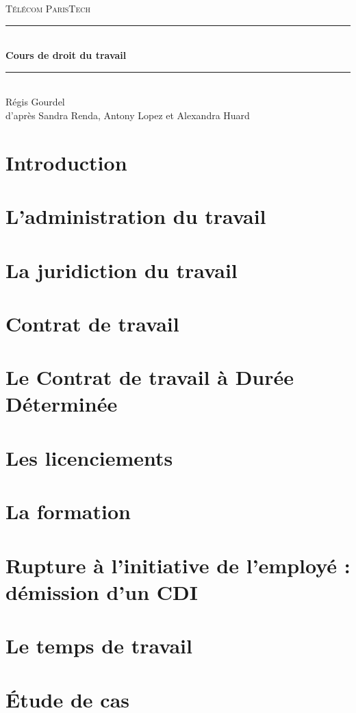 \documentclass[a4paper,10pt]{article}
\theoremstyle{remark}
\begin{document}
\renewcommand{\contentsname}{Sommaire}
\setcounter{tocdepth}{1}



\begin{titlepage}
	\newcommand{\HRule}{\rule{\linewidth}{0.5mm}}

	\center

	\textsc{\LARGE Télécom ParisTech}\\[1.2cm]

	\HRule \\[0.8cm]
	{ \huge \bfseries Cours de droit du travail}\\[0.4cm]
	\HRule \\[1.4cm]
	
	{\selectfont
	Régis Gourdel\\
	d'après Sandra Renda, Antony Lopez et Alexandra Huard
	}\\[0.8cm]
	
	\tableofcontents


\end{titlepage}

\section{Introduction}
	

\section{L'administration du travail}
	

\section{La juridiction du travail}
	

\section{Contrat de travail}
	

\section{Le Contrat de travail à Durée Déterminée}
	

\section{Les licenciements}
	

\section{La formation}
	

\section{Rupture à l’initiative de l’employé : démission d'un CDI}
	

\section{Le temps de travail}
	

\section{Étude de cas}
	
\end{document}
